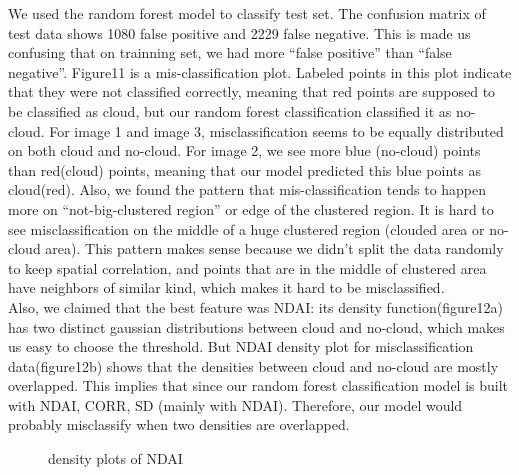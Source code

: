 \documentclass[12pt]{extarticle}
\begin{document}
We used the random forest model to classify test set. The confusion matrix of test data shows 1080 false positive and 2229 false negative. This is made us confusing that on trainning set, we had more “false positive” than “false negative”.  Figure11 is a mis-classification plot. Labeled points in this plot indicate that they were not classified correctly, meaning that red points are supposed to be classified as cloud, but our random forest classification classified it as no-cloud. For image 1 and image 3, misclassification seems to be equally distributed on both cloud and no-cloud. For image 2, we see more blue (no-cloud) points than red(cloud) points, meaning that our model predicted this blue points as cloud(red). Also, we found the pattern that mis-classification tends to happen more on “not-big-clustered region” or edge of the clustered region. It is hard to see misclassification on the middle of a huge clustered region (clouded area or no-cloud area). This pattern makes sense because we didn't split the data randomly to keep spatial correlation, and points that are in the middle of clustered area have neighbors of similar kind, which makes it hard to be misclassified. 
\\
Also, we claimed that the best feature was NDAI: its density function(figure12a) has two distinct gaussian distributions between cloud and no-cloud, which makes us easy to choose the threshold. But NDAI density plot for misclassification data(figure12b) shows that the densities between cloud and no-cloud are mostly overlapped. This implies that since our random forest classification model is built with NDAI, CORR, SD (mainly with NDAI). Therefore, our model would probably misclassify when two densities are overlapped.


\begin{figure}[htb]
\centering
{}
\quad
{}
\caption{density plots of NDAI}\label{fig 1}
\end{figure}
\end{document}
